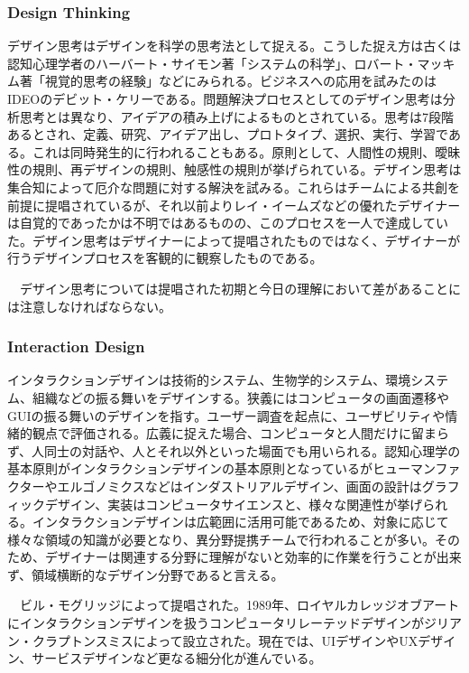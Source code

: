 \subsubsection{Design Thinking}
デザイン思考はデザインを科学の思考法として捉える。こうした捉え方は古くは認知心理学者のハーバート・サイモン著「システムの科学」、ロバート・マッキム著「視覚的思考の経験」などにみられる。ビジネスへの応用を試みたのはIDEOのデビット・ケリーである。問題解決プロセスとしてのデザイン思考は分析思考とは異なり、アイデアの積み上げによるものとされている。思考は7段階あるとされ、定義、研究、アイデア出し、プロトタイプ、選択、実行、学習である。これは同時発生的に行われることもある。原則として、人間性の規則、曖昧性の規則、再デザインの規則、触感性の規則が挙げられている。デザイン思考は集合知によって厄介な問題に対する解決を試みる。これらはチームによる共創を前提に提唱されているが、それ以前よりレイ・イームズなどの優れたデザイナーは自覚的であったかは不明ではあるものの、このプロセスを一人で達成していた。デザイン思考はデザイナーによって提唱されたものではなく、デザイナーが行うデザインプロセスを客観的に観察したものである。

　デザイン思考については提唱された初期と今日の理解において差があることには注意しなければならない。

\subsubsection{Interaction Design}
インタラクションデザインは技術的システム、生物学的システム、環境システム、組織などの振る舞いをデザインする。狭義にはコンピュータの画面遷移やGUIの振る舞いのデザインを指す。ユーザー調査を起点に、ユーザビリティや情緒的観点で評価される。広義に捉えた場合、コンピュータと人間だけに留まらず、人同士の対話や、人とそれ以外といった場面でも用いられる。認知心理学の基本原則がインタラクションデザインの基本原則となっているがヒューマンファクターやエルゴノミクスなどはインダストリアルデザイン、画面の設計はグラフィックデザイン、実装はコンピュータサイエンスと、様々な関連性が挙げられる。インタラクションデザインは広範囲に活用可能であるため、対象に応じて様々な領域の知識が必要となり、異分野提携チームで行われることが多い。そのため、デザイナーは関連する分野に理解がないと効率的に作業を行うことが出来ず、領域横断的なデザイン分野であると言える。

　ビル・モグリッジによって提唱された。1989年、ロイヤルカレッジオブアートにインタラクションデザインを扱うコンピュータリレーテッドデザインがジリアン・クラプトンスミスによって設立された。現在では、UIデザインやUXデザイン、サービスデザインなど更なる細分化が進んでいる。



